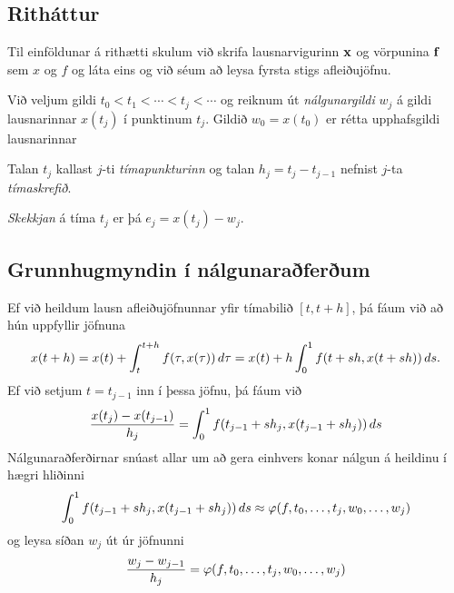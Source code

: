 \documentclass[letterpaper,10pt,icelandic]{sphinxmanual}
\begin{document}

\subsection{Ritháttur}
\label{kafli06:rithattur}\label{kafli06:index-4}
Til einföldunar á rithætti skulum við skrifa lausnarvigurinn
\({\mbox{${\bf x}$}}\) og vörpunina \({\mbox{${\bf f}$}}\) sem
\(x\) og \(f\) og láta eins og við séum að leysa fyrsta stigs
afleiðujöfnu.

Við veljum gildi \(t_0 < t_1 < \cdots < t_j<\cdots\) og reiknum út
\emph{nálgunargildi} \(w_j\) á gildi lausnarinnar \(x(t_j)\) í
punktinum \(t_j\). Gildið \(w_0=x(t_0)\) er rétta upphafsgildi
lausnarinnar

Talan \(t_j\) kallast \(j\)-ti \emph{tímapunkturinn} og talan
\(h_j=t_j-t_{j-1}\) nefnist \(j\)-ta \emph{tímaskrefið}.

\emph{Skekkjan} á tíma \(t_j\) er þá \(e_j = x(t_j)-w_j\).


\subsection{Grunnhugmyndin í nálgunaraðferðum}
\label{kafli06:grunnhugmyndin-i-nalgunaraferum}
Ef við heildum lausn afleiðujöfnunnar yfir tímabilið \([t,t+h]\), þá
fáum við að hún uppfyllir jöfnuna
\begin{gather}
\begin{split}x(t+h)=x(t)+\int_t^{t+h}f(\tau,x(\tau))\, d\tau
=x(t)+h\int_0^1f(t+sh,x(t+sh))\, ds.\end{split}\notag
\end{gather}
Ef við setjum \(t=t_{j-1}\) inn í þessa jöfnu, þá fáum við
\begin{gather}
\begin{split}\dfrac{x(t_j)-x(t_{j-1})}{h_j}=\int_0^1f(t_{j-1}+sh_j,x(t_{j-1}+sh_j))\, ds\end{split}\notag
\end{gather}
Nálgunaraðferðirnar snúast allar um að gera einhvers konar nálgun á
heildinu í hægri hliðinni
\begin{gather}
\begin{split}\int_0^1f(t_{j-1}+sh_j,x(t_{j-1}+sh_j))\, ds
  \approx \varphi(f,t_0,\dots,t_j,w_0,\dots,w_j)\end{split}\notag
\end{gather}
og leysa síðan \(w_j\) út úr jöfnunni
\begin{gather}
\begin{split}\dfrac{w_j-w_{j-1}}{h_j}=\varphi(f,t_0,\dots,t_j,w_0,\dots,w_j)\end{split}\notag
\end{gather}
\end{document}

